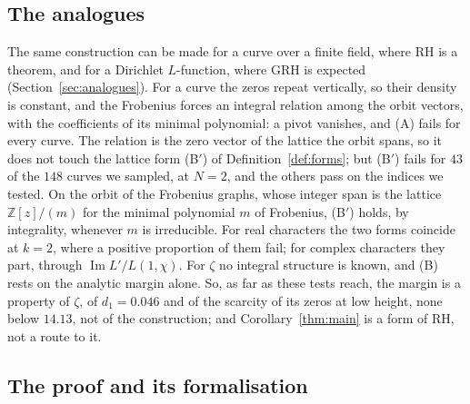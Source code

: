 \documentclass[11pt]{article}
\theoremstyle{definition}
\begin{document}
\subsection*{The analogues}

The same construction can be made for a curve over a finite field, where RH is a theorem, and for a Dirichlet
$L$-function, where GRH is expected (Section~\ref{sec:analogues}). For a curve the zeros repeat vertically, so their
density is constant, and the Frobenius forces an integral relation among the orbit vectors, with the coefficients of its
minimal polynomial: a pivot vanishes, and (A) fails for every curve. The relation is the zero vector of the lattice the
orbit spans, so it does not touch the lattice form (B$'$) of
Definition~\ref{def:forms}; but (B$'$) fails for $43$ of the
$148$ curves we sampled, at $N = 2$, and the others pass on the indices we tested. On the orbit of the Frobenius graphs,
whose integer span is the lattice $\mathbb Z[z]/(m)$ for the minimal polynomial $m$ of Frobenius, (B$'$) holds, by
integrality, whenever $m$ is irreducible. For real characters the two forms coincide at $k = 2$, where a positive
proportion of them fail; for complex characters they part, through $\operatorname{Im} L'/L(1, \chi)$. For $\zeta$ no
integral structure is known, and (B) rests on the analytic margin alone. So, as far as these tests reach, the margin
is a property of $\zeta$, of $d_1 = 0.046$ and of the scarcity of its zeros at low height, none below $14.13$, not of
the construction; and Corollary~\ref{thm:main} is a form of RH, not a route to it.

\subsection*{The proof and its formalisation}
\end{document}
